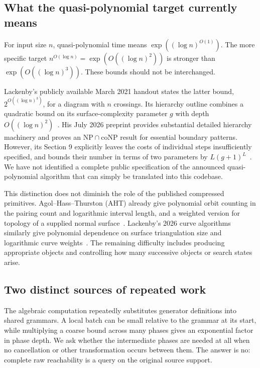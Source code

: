 \subsection{What the quasi-polynomial target currently means}

For input size $n$, quasi-polynomial time means
$\exp((\log n)^{O(1)})$. The more specific target
$n^{O(\log n)}=\exp(O((\log n)^2))$ is stronger than
$\exp(O((\log n)^3))$. These bounds should not be interchanged.

Lackenby's publicly available March 2021 handout states the latter bound,
$2^{O((\log n)^3)}$, for a diagram with $n$ crossings. Its hierarchy
outline combines a quadratic bound on its surface-complexity parameter $g$ with
depth $O((\log n)^2)$~\cite{lackenby-talk}. His July 2026 preprint provides
substantial detailed hierarchy machinery and proves an
$\mathrm{NP}\cap\mathrm{coNP}$ result for essential boundary patterns.
However, its Section 9 explicitly leaves the costs of individual steps
insufficiently specified, and bounds their number in terms of two
parameters by $L(g+1)^L$~\cite{lackenby-2026}. We have not identified a
complete public specification of the announced quasi-polynomial algorithm
that can simply be translated into this codebase.

This distinction does not diminish the role of the published compressed
primitives. Agol--Hass--Thurston (AHT) already give polynomial orbit counting
in the pairing count and logarithmic interval length, and a weighted
version for topology of a supplied normal surface~\cite{aht}. Lackenby's
2026 curve algorithms similarly give polynomial dependence on surface
triangulation size and logarithmic curve weights~\cite{lackenby-curves}.
The remaining difficulty includes producing appropriate objects and
controlling how many successive objects or search states arise.

\subsection{Two distinct sources of repeated work}

The algebraic computation repeatedly substitutes generator definitions
into shared grammars. A local batch can be small relative to the grammar
at its start, while multiplying a coarse bound across many phases gives
an exponential factor in phase depth. We ask whether the intermediate
phases are needed at all when no cancellation or other transformation
occurs between them. The answer is no: complete raw reachability is a
query on the original source support.

